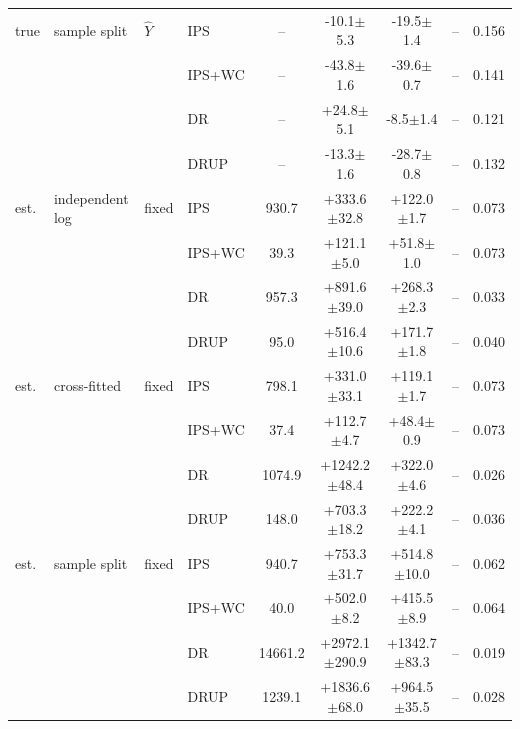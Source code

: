 \begin{tabular}{llllccccc}
\midrule
true & sample split & $\hat Y$ & IPS & -- & -10.1$\pm$5.3 & -19.5$\pm$1.4 & -- & 0.156\\
 &  &  & IPS+WC & -- & -43.8$\pm$1.6 & -39.6$\pm$0.7 & -- & 0.141\\
 &  &  & DR & -- & +24.8$\pm$5.1 & -8.5$\pm$1.4 & -- & 0.121\\
 &  &  & DRUP & -- & -13.3$\pm$1.6 & -28.7$\pm$0.8 & -- & 0.132\\
\midrule
est. & independent log & fixed & IPS & 930.7 & +333.6$\pm$32.8 & +122.0$\pm$1.7 & -- & 0.073\\
 &  &  & IPS+WC & 39.3 & +121.1$\pm$5.0 & +51.8$\pm$1.0 & -- & 0.073\\
 &  &  & DR & 957.3 & +891.6$\pm$39.0 & +268.3$\pm$2.3 & -- & 0.033\\
 &  &  & DRUP & 95.0 & +516.4$\pm$10.6 & +171.7$\pm$1.8 & -- & 0.040\\
\midrule
est. & cross-fitted & fixed & IPS & 798.1 & +331.0$\pm$33.1 & +119.1$\pm$1.7 & -- & 0.073\\
 &  &  & IPS+WC & 37.4 & +112.7$\pm$4.7 & +48.4$\pm$0.9 & -- & 0.073\\
 &  &  & DR & 1074.9 & +1242.2$\pm$48.4 & +322.0$\pm$4.6 & -- & 0.026\\
 &  &  & DRUP & 148.0 & +703.3$\pm$18.2 & +222.2$\pm$4.1 & -- & 0.036\\
\midrule
est. & sample split & fixed & IPS & 940.7 & +753.3$\pm$31.7 & +514.8$\pm$10.0 & -- & 0.062\\
 &  &  & IPS+WC & 40.0 & +502.0$\pm$8.2 & +415.5$\pm$8.9 & -- & 0.064\\
 &  &  & DR & 14661.2 & +2972.1$\pm$290.9 & +1342.7$\pm$83.3 & -- & 0.019\\
 &  &  & DRUP & 1239.1 & +1836.6$\pm$68.0 & +964.5$\pm$35.5 & -- & 0.028\\
\bottomrule
\end{tabular}
